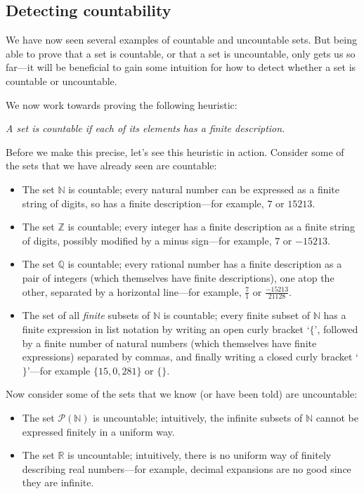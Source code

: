 \subsection*{Detecting countability}

We have now seen several examples of countable and uncountable sets. But being able to prove that a set is countable, or that a set is uncountable, only gets us so far---it will be beneficial to gain some intuition for how to detect whether a set is countable or uncountable.

We now work towards proving the following heuristic:

\begin{center}
\textit{A set is countable if each of its elements has a finite description.}
\end{center}

Before we make this precise, let's see this heuristic in action. Consider some of the sets that we have already seen are countable:
\begin{itemize}
\item The set $\mathbb{N}$ is countable; every natural number can be expressed as a finite string of digits, so has a finite description---for example, $7$ or $15213$.
\item The set $\mathbb{Z}$ is countable; every integer has a finite description as a finite string of digits, possibly modified by a minus sign---for example, $7$ or $-15213$.
\item The set $\mathbb{Q}$ is countable; every rational number has a finite description as a pair of integers (which themselves have finite descriptions), one atop the other, separated by a horizontal line---for example, $\frac{7}{1}$ or $\frac{-15213}{21128}$.
\item The set of all \textit{finite} subsets of $\mathbb{N}$ is countable; every finite subset of $\mathbb{N}$ has a finite expression in list notation by writing an open curly bracket `$\{$', followed by a finite number of natural numbers (which themselves have finite expressions) separated by commas, and finally writing a closed curly bracket `$\}$'---for example $\{ 15, 0, 281 \}$ or $\{ \}$.
\end{itemize}

Now consider some of the sets that we know (or have been told) are uncountable:
\begin{itemize}
\item The set $\mathcal{P}(\mathbb{N})$ is uncountable; intuitively, the infinite subsets of $\mathbb{N}$ cannot be expressed finitely in a uniform way.
\item The set $\mathbb{R}$ is uncountable; intuitively, there is no uniform way of finitely describing real numbers---for example, decimal expansions are no good since they are infinite.
\end{itemize}

